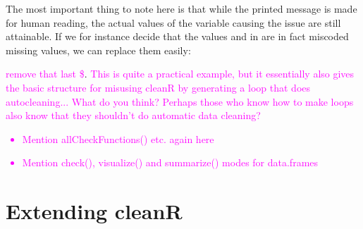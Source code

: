 \documentclass[article]{jss}
\newcommand{\hl}[1]{\textcolor{magenta}{#1}}
\newcommand{\R}[1]{\code{#1}}
\begin{document}
\begin{Schunk}
\end{Schunk}
The most important thing to note here is that while the printed message is made for human reading, the actual values of the variable causing the issue are still attainable. If we for instance decide that the values \R{999} and \R{NaN} in \R{var2} are in fact miscoded missing values, we can replace them easily:
\begin{Schunk}
\begin{Sinput}
> toyData$var2[toyData$var2 %
> identifyMissing(toyData$var2}
\end{Sinput}
\end{Schunk}
\hl{remove that last \$}. \hl{This is quite a practical example, but it essentially also gives the basic structure for misusing cleanR by generating a loop that does autocleaning... What do you think? Perhaps those who know how to make loops also know that they shouldn't do automatic data cleaning?}

\hl{
\begin{itemize}
\item  Mention allCheckFunctions() etc. again here
\item Mention check(), visualize() and summarize() modes for data.frames
\end{itemize}
}

\section{Extending cleanR} 
\label{sec:extending}
\end{document}
